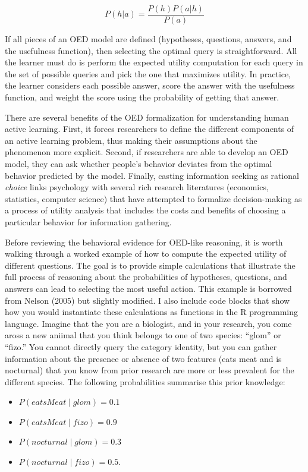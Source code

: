 \documentclass[english,floatsintext,man]{apa6}
\providecommand{\tightlist}{%
  \setlength{\itemsep}{0pt}\setlength{\parskip}{0pt}}
\theoremstyle{definition}
\theoremstyle{definition}
\theoremstyle{definition}
\theoremstyle{remark}
\begin{document}
\[ P(h|a) = \frac{P(h)P(a|h)}{P(a)} \]

\noindent
If all pieces of an OED model are defined (hypotheses, questions,
answers, and the usefulness function), then selecting the optimal query
is straightforward. All the learner must do is perform the expected
utility computation for each query in the set of possible queries and
pick the one that maximizes utility. In practice, the learner considers
each possible answer, score the answer with the usefulness function, and
weight the score using the probability of getting that answer.

There are several benefits of the OED formalization for understanding
human active learning. First, it forces researchers to define the
different components of an active learning problem, thus making their
assumptions about the phenomenon more explicit. Second, if researchers
are able to develop an OED model, they can ask whether people's behavior
deviates from the optimal behavior predicted by the model. Finally,
casting information seeking as rational \emph{choice} links psychology
with several rich research literatures (economics, statistics, computer
science) that have attempted to formalize decision-making as a process
of utility analysis that includes the costs and benefits of choosing a
particular behavior for information gathering.

Before reviewing the behavioral evidence for OED-like reasoning, it is
worth walking through a worked example of how to compute the expected
utility of different questions. The goal is to provide simple
calculations that illustrate the full process of reasoning about the
probabilities of hypotheses, questions, and answers can lead to
selecting the most useful action. This example is borrowed from Nelson
(2005) but slightly modified. I also include code blocks that show how
you would instantiate these calculations as functions in the R
programming language. Imagine that the you are a biologist, and in your
research, you come aross a new aniimal that you think belongs to one of
two species: \enquote{glom} or \enquote{fizo.} You cannot directly query
the category identity, but you can gather information about the presence
or absence of two features (eats meat and is nocturnal) that you know
from prior research are more or less prevalent for the different
species. The following probabilities summarise this prior knowledge:

\begin{itemize}
\tightlist
\item
  \(P(eatsMeat \mid glom) = 0.1\)\\
\item
  \(P(eatsMeat \mid fizo) = 0.9\)
\item
  \(P(nocturnal \mid glom) = 0.3\)\\
\item
  \(P(nocturnal \mid fizo) = 0.5\).
\end{itemize}
\end{document}
